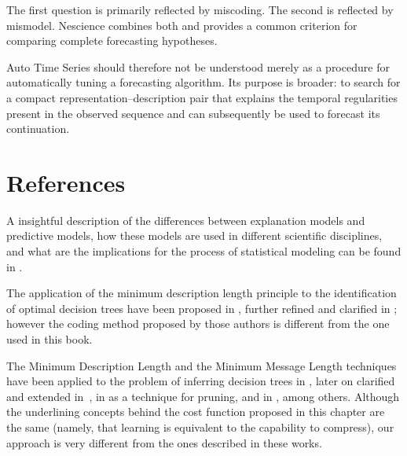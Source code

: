 The first question is primarily reflected by miscoding. The second is reflected
by mismodel. Nescience combines both and provides a common criterion for
comparing complete forecasting hypotheses.

Auto Time Series should therefore not be understood merely as a procedure for
automatically tuning a forecasting algorithm. Its purpose is broader: to search
for a compact representation--description pair that explains the temporal
regularities present in the observed sequence and can subsequently be used to
forecast its continuation.


%
%

\section*{References}
\label{sec:ML_references}


A insightful description of the differences between explanation models and predictive models, how these models are used in different scientific disciplines, and what are the implications for the process of statistical modeling can be found in \cite{shmueli2010explain}.

The application of the minimum description length principle to the identification of optimal decision trees have been proposed in \cite{quinlan1989inferring}, further refined and clarified in \cite{wallace1993coding}; however the coding method proposed by those authors is different from the one used in this book.

The Minimum Description Length \cite{grunwald2007minimum} and the Minimum Message Length \cite{wallace2005statistical} techniques have been applied to the problem of inferring decision trees in \cite{quinlan1989inferring}, later on clarified and extended in~\cite{wallace1993coding}, in \cite{mehta1995mdl} as a technique for pruning, and in \cite{rastogi1998public}, among others. Although the underlining concepts behind the cost function proposed in this chapter are the same (namely, that learning is equivalent to the capability to compress), our approach is very different from the ones described in these works.


